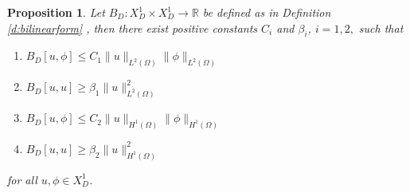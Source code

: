 \documentclass[11pt]{amsart}   	%
\theoremstyle{plain}
\numberwithin{equation}{section}
\newtheorem{proposition}[thm]{Proposition}
\def\R{\mathbb{R}}
\begin{document}
\begin{proposition}\label{p:bilinearform1}
Let $B_D: X^1_D \times X^1_D \longrightarrow \R $ be defined as in Definition \ref{d:bilinearform} , then there exist positive constants $C_i$ and $\beta_i$, $i =1,2,$ such that
\begin{enumerate}[label=\textbf{D\arabic*}]
\item\label{D1} $ B_D[u,\phi] \leq C_1 \| u\|_{L^2(\Omega)} \| \phi\|_{L^2(\Omega)}$
\item\label{D2} $ B_D[u,u] \geq \beta_1 \| u\|^2_{L^2(\Omega)}$
\item\label{D3} $ B_D[u,\phi] \leq C_2 \| u\|_{H^1(\Omega)} \| \phi\|_{H^1(\Omega)}$
\item\label{D4} $ B_D[u,u] \geq \beta_2 \| u\|^2_{H^1(\Omega)}$
\end{enumerate}
for all $u, \phi \in X^1_D$.
\end{proposition}
\end{document}
